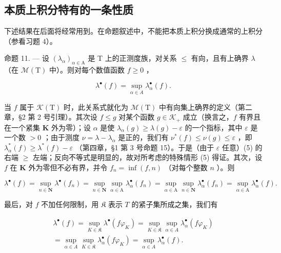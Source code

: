 \subsection{本质上积分特有的一条性质}

下述结果在后面将经常用到。在命题叙述中，不能把本质上积分换成通常的上积分（参看习题 4）。

命题 11. --- 设 \((\lambda_{\alpha})_{\alpha\in\mathrm{A}}\) 是 T 上的正测度族，对关系 \(\leqslant\) 有向，且有上确界 \(\lambda\) （在 \(\mathcal{M}(\mathrm{T})\) 中）。则对每个数值函数 \(f\geqslant0\) ，

\[
\lambda^ {\bullet} (f) = \sup _ {\alpha \in A} \lambda_ {\alpha} ^ {\bullet} (f).\tag{5}
\]

当 \(f\) 属于 \(\mathcal{K}(\mathrm{T})\) 时，此关系式就化为 \(\mathcal{M}(\mathrm{T})\) 中有向集上确界的定义（第二章，§2 第 2 号引理）。其次设 \(f \leqslant g\) 对某个函数 \(g \in \mathcal{K}_+\) 成立（换言之，\(f\) 有界且在一个紧集 \(\mathbf{K}\) 外为零）；设 \(\alpha\) 是使 \(\lambda_{\alpha}(g) \geqslant \lambda(g) - \varepsilon\) 的一个指标，其中 \(\varepsilon\) 是一个数 \(>0\) ；由于测度 \(\nu = \lambda - \lambda_{\alpha}\) 是正的，我们有 \(\nu^{*}(f) \leqslant \nu(g) \leqslant \varepsilon\) ，即 \(\lambda_{\alpha}^{*}(f) \geqslant \lambda^{*}(f) - \varepsilon\) （第四章，§1 第 3 号命题 15）。于是（由于 \(\varepsilon\) 任意）(5) 的右端 \(\geqslant\) 左端；反向不等式是明显的，故对所考虑的特殊情形 (5) 得证。其次，设 \(f\) 在 \(\mathbf{K}\) 外为零但不必有界，并令 \(f_n = \inf(f, n)\) （对每个整数 \(n\) ）。则

\[
\lambda^ {\bullet} (f) = \sup _ {n \in \mathbf {N}} \lambda^ {\bullet} (f _ {n}) = \sup _ {n \in \mathbf {N}} \sup _ {\alpha \in \mathrm{A}} \lambda_ {\alpha} ^ {\bullet} (f _ {n}) = \sup _ {\alpha \in \mathrm{A}} \sup _ {n \in \mathbf {N}} \lambda_ {\alpha} ^ {\bullet} (f _ {n}) = \sup _ {\alpha \in \mathrm{A}} \lambda_ {\alpha} ^ {\bullet} (f).
\]

最后，对 \(f\) 不加任何限制，用 \(\mathfrak{K}\) 表示 \(T\) 的紧子集所成之集，我们有

\[
\begin{array}{c} \lambda^ {\bullet} (f) = \sup _ {K \in \mathfrak {K}} \lambda^ {\bullet} (f \varphi_ {K}) = \sup _ {K \in \mathfrak {K}} \sup _ {\alpha \in A} \lambda_ {\alpha} ^ {\bullet} (f \varphi_ {K}) \\ = \sup _ {\alpha \in A} \sup _ {K \in \mathfrak {K}} \lambda_ {\alpha} ^ {\bullet} (f \varphi_ {K}) = \sup _ {\alpha \in A} \lambda_ {\alpha} ^ {\bullet} (f). \end{array}
\]

